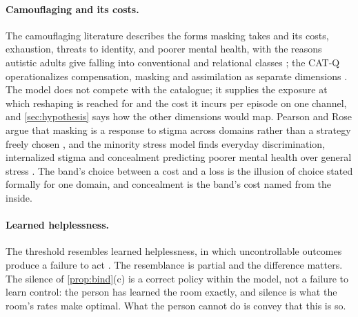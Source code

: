 \paragraph{Camouflaging and its costs.} The camouflaging literature describes the forms masking takes and its costs, exhaustion, threats to identity, and poorer mental health, with the reasons autistic adults give falling into conventional and relational classes \cite{Hull2017, Cage2019, Livingston2019}; the CAT-Q operationalizes compensation, masking and assimilation as separate dimensions \cite{Hull2019}. The model does not compete with the catalogue; it supplies the exposure at which reshaping is reached for and the cost it incurs per episode on one channel, and \autoref{sec:hypothesis} says how the other dimensions would map. Pearson and Rose argue that masking is a response to stigma across domains rather than a strategy freely chosen \cite{Pearson2021}, and the minority stress model finds everyday discrimination, internalized stigma and concealment predicting poorer mental health over general stress \cite{Botha2020}. The band's choice between a cost and a loss is the illusion of choice stated formally for one domain, and concealment is the band's cost named from the inside.

\paragraph{Learned helplessness.} The threshold resembles learned helplessness, in which uncontrollable outcomes produce a failure to act \cite{Maier1976}. The resemblance is partial and the difference matters. The silence of \autoref{prop:bind}(c) is a correct policy within the model, not a failure to learn control: the person has learned the room exactly, and silence is what the room's rates make optimal. What the person cannot do is convey that this is so.

